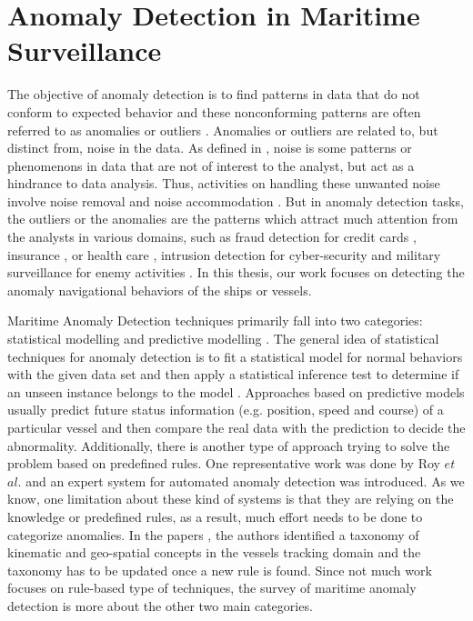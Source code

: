 \documentclass[12pt,glossary]{dalcsthesis}
\begin{document}
\section{Anomaly Detection in Maritime Surveillance}
\label{survey_anomaly_detection}

The objective of anomaly detection is to find patterns in data that do not conform to expected behavior and these nonconforming patterns are often referred to as anomalies or outliers \cite{chandola}. Anomalies or outliers are related to, but distinct from, noise in the data. As defined in \cite{chandola}, noise is some patterns or phenomenons in data that are not of interest to the analyst, but act as a hindrance to data analysis. Thus, activities on handling these unwanted noise involve noise removal \cite{teng1990adaptive} and noise accommodation \cite{rousseeuw2005}. But in anomaly detection tasks, the outliers or the anomalies are the patterns which attract much attention from the analysts in various domains, such as fraud detection for credit cards \cite{creditcard}, insurance \cite{insurance}, or health care \cite{healthcare}, intrusion detection
for cyber-security \cite{cyber} and military surveillance for enemy activities \cite{chandola}.  In this thesis, our work focuses on detecting the anomaly navigational behaviors  of the ships or vessels. 

Maritime Anomaly Detection techniques primarily fall into two categories: statistical modelling \cite{gmm}\cite{kde}\cite{Gerben} and predictive modelling \cite{PallottaFramework}\cite{bn_White}\cite{bn_Richard}. The general idea of  statistical techniques for anomaly detection is to fit a statistical model for normal behaviors with the given data set and then apply a statistical inference test to determine if an unseen instance belongs to the model \cite{chandola}. Approaches based on predictive models usually predict future status information (e.g. position, speed and course) of a particular vessel and then compare the real data with the prediction to decide the abnormality. Additionally, there is another type of approach trying to solve the problem based on predefined rules. One representative work was done by Roy $et$ $al$. \cite{roy2010rule}\cite{roy2009categorization} and an expert system for automated anomaly detection was introduced.  As we know, one limitation about these kind of systems is that they are  relying on the knowledge or predefined rules, as a result, much effort needs to be done to categorize anomalies. In the papers \cite{roy2010rule}\cite{roy2009categorization}, the authors identified a taxonomy of kinematic and geo-spatial concepts in the vessels tracking domain and the taxonomy has to be updated once a new rule is found.  Since not much work focuses on rule-based type of techniques, the survey of maritime anomaly detection is more about the other two main categories.
\end{document}
